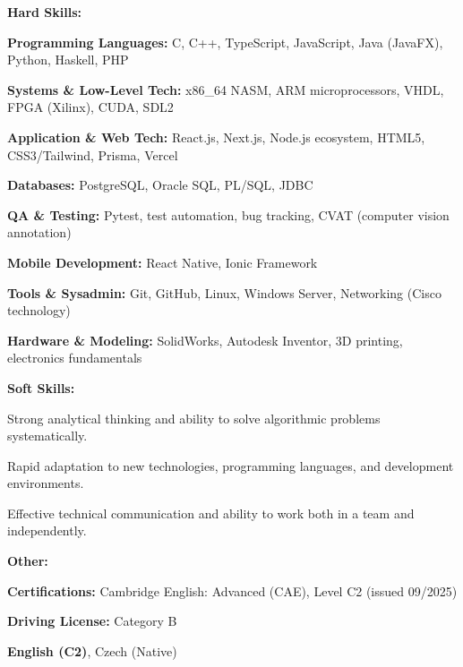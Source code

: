 \documentclass[10pt,a4paper]{article}
\begin{document}
\hspace*{7pt}\textbf{Hard Skills:}
\begin{cvlist}
  \item \textbf{Programming Languages:} C, C++, TypeScript, JavaScript, Java (JavaFX), Python, Haskell, PHP
  \item \textbf{Systems \& Low-Level Tech:} x86\_64 NASM, ARM microprocessors, VHDL, FPGA (Xilinx), CUDA, SDL2
  \item \textbf{Application \& Web Tech:} React.js, Next.js, Node.js ecosystem, HTML5, CSS3/Tailwind, Prisma, Vercel
  \item \textbf{Databases:} PostgreSQL, Oracle SQL, PL/SQL, JDBC
  \item \textbf{QA \& Testing:} Pytest, test automation, bug tracking, CVAT (computer vision annotation)
  \item \textbf{Mobile Development:} React Native, Ionic Framework
  \item \textbf{Tools \& Sysadmin:} Git, GitHub, Linux, Windows Server, Networking (Cisco technology)
  \item \textbf{Hardware \& Modeling:} SolidWorks, Autodesk Inventor, 3D printing, electronics fundamentals
\end{cvlist}

\hspace*{7pt}\textbf{Soft Skills:}
\begin{cvlist}
  \item Strong analytical thinking and ability to solve algorithmic problems systematically.
  \item Rapid adaptation to new technologies, programming languages, and development environments.
  \item Effective technical communication and ability to work both in a team and independently.
\end{cvlist}

\hspace*{7pt}\textbf{Other:}
\begin{cvlist}
  \item \textbf{Certifications:} Cambridge English: Advanced (CAE), Level C2 (issued 09/2025)
  \item \textbf{Driving License:} Category B
\end{cvlist}

\textbf{English (C2)}, Czech (Native)
\end{document}
